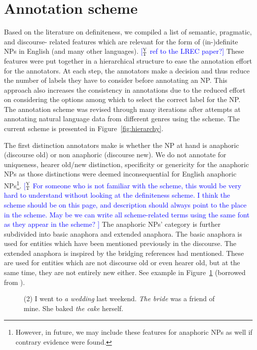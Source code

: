 \documentclass[11pt,letterpaper]{article}
\newcommand{\ensuretext}[1]{#1}
\newcommand{\ytmarker}{\ensuretext{\textcolor{blue}{\ensuremath{^{\textsc{Y}}_{\textsc{T}}}}}}
\newcommand{\arkcomment}[3]{\ensuretext{\textcolor{#3}{[#1 #2]}}}
\newcommand{\yt}[1]{\arkcomment{\ytmarker}{#1}{blue}}
\begin{document}
\section{Annotation scheme}\label{sec:scheme}
Based on the literature on definiteness, we compiled a list of semantic, pragmatic, and discourse- related features which are relevant for the form of (in-)definite NPs in English (and many other languages). \yt{ref to the LREC paper?} These features were put together in a hierarchical structure to ease the annotation effort for the annotators. At each step, the annotators make a decision and thus reduce the number of labels they have to consider before annotating an NP. This approach also increases the consistency in annotations due to the reduced effort on considering the options among which to select the correct label for the NP. The annotation scheme was revised through many iterations after attempts at annotating natural language data from different genres using the scheme. The current scheme is presented in Figure~\ref{fig:hierarchy}. 

The first distinction annotators make is whether the NP at hand is anaphoric (discourse old) or non anaphoric (discourse new). We do not annotate for uniqueness, hearer old/new distinction, specificity or genericity for the anaphoric NPs as those distinctions were deemed inconsequential for English anaphoric NPs\footnote{However, in future, we may include these features for anaphoric NPs as well if contrary evidence were found.}. \yt{For someone who is not familiar with the scheme, this would be very hard to understand without looking at the definiteness scheme. I think the scheme should be on this page, and description should always point to the place in the scheme. May be we can write all scheme-related terms using the same font as they appear in the scheme? } The anaphoric NPs’ category is further subdivided into basic anaphora and extended anaphora. The basic anaphora is used for entities which have been mentioned previously in the discourse. The extended anaphora is inspired by the bridging references \cite{clark77} had mentioned. These are used for entities which are not discourse old or even hearer old, but at the same time, they are not entirely new either.  See example in Figure~\ref{fig:bridging} (borrowed from \cite{poesio98}). 

\begin{figure}
\vspace*{0.1cm}
\begin{footnotesize}
(2) I went to {\it a wedding} last weekend. {\it The bride} was a friend of mine. She baked {\it the cake} herself. 
\end{footnotesize}
\label{fig:bridging}
\end{figure}
\end{document}
